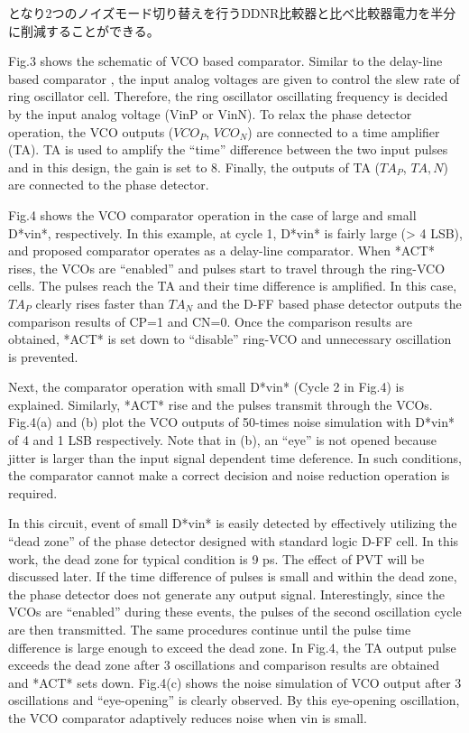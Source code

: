 \documentclass[letterpaper, 10 pt, conference]{ieeeconf}  %
\begin{document}
となり2つのノイズモード切り替えを行うDDNR比較器と比べ比較器電力を半分に削減することができる。

Fig.3 shows the schematic of VCO based comparator. Similar to the delay-line based comparator \cite{agnes20089}, the input analog voltages are given to control the slew rate of ring oscillator cell. Therefore, the ring oscillator oscillating frequency is decided by the input analog voltage (VinP or VinN). To relax the phase detector operation, the VCO outputs ($VCO_P$, $VCO_N$) are connected to a time amplifier (TA). TA \cite{lee20089} is used to amplify the “time” difference between the two input pulses and in this design, the gain is set to 8. Finally, the outputs of TA ($TA_P$, $TA,N$) are connected to the phase detector.

Fig.4 shows the VCO comparator operation in the case of large and small D*vin*, respectively. In this example, at cycle 1, D*vin* is fairly large (> 4 LSB), and proposed comparator operates as a delay-line comparator. When *ACT* rises, the VCOs are “enabled” and pulses start to travel through the ring-VCO cells. The pulses reach the TA and their time difference is amplified. In this case, $TA_P$ clearly rises faster than $TA_N$ and the D-FF based phase detector outputs the comparison results of CP=1 and CN=0. Once the comparison results are obtained, *ACT* is set down to “disable” ring-VCO and unnecessary oscillation is prevented.

Next, the comparator operation with small D*vin* (Cycle 2 in Fig.4) is explained. Similarly, *ACT* rise and the pulses transmit through the VCOs. Fig.4(a) and (b) plot the VCO outputs of 50-times noise simulation with D*vin* of 4 and 1 LSB respectively. Note that in (b), an “eye” is not opened because jitter is larger than the input signal dependent time deference. In such conditions, the comparator cannot make a correct decision and noise reduction operation is required.

In this circuit, event of small D*vin* is easily detected by effectively utilizing the “dead zone” of the phase detector designed with standard logic D-FF cell. In this work, the dead zone for typical condition is 9 ps. The effect of PVT will be discussed later. If the time difference of pulses is small and within the dead zone, the phase detector does not generate any output signal. Interestingly, since the VCOs are “enabled” during these events, the pulses of the second oscillation cycle are then transmitted. The same procedures continue until the pulse time difference is large enough to exceed the dead zone. In Fig.4, the TA output pulse exceeds the dead zone after 3 oscillations and comparison results are obtained and *ACT* sets down. Fig.4(c) shows the noise simulation of VCO output after 3 oscillations and “eye-opening” is clearly observed. By this eye-opening oscillation, the VCO comparator adaptively reduces noise when vin is small.
\end{document}
